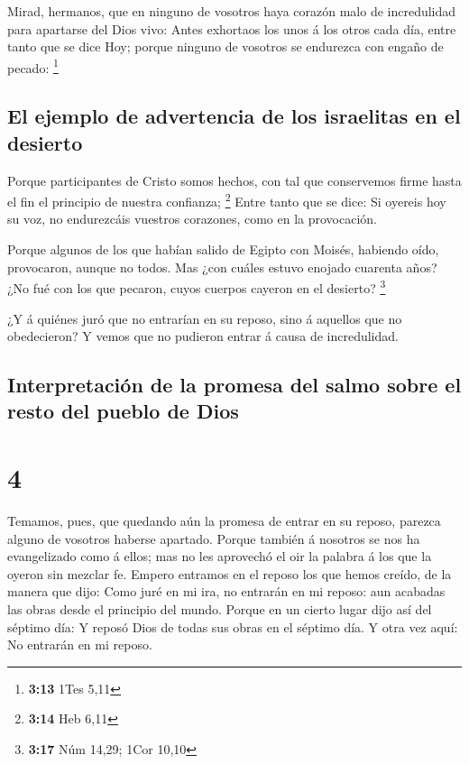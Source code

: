  Mirad, hermanos, que en ninguno de vosotros haya corazón
malo de incredulidad para apartarse del Dios vivo:  Antes
exhortaos los unos á los otros cada día, entre tanto que se dice Hoy;
porque ninguno de vosotros se endurezca con engaño de pecado:
\footnote{\textbf{3:13} 1Tes 5,11}

\hypertarget{el-ejemplo-de-advertencia-de-los-israelitas-en-el-desierto}{%
\subsection{El ejemplo de advertencia de los israelitas en el
desierto}\label{el-ejemplo-de-advertencia-de-los-israelitas-en-el-desierto}}

 Porque participantes de Cristo somos hechos, con tal que
conservemos firme hasta el fin el principio de nuestra confianza;
\footnote{\textbf{3:14} Heb 6,11}  Entre tanto que se dice:
Si oyereis hoy su voz, no endurezcáis vuestros corazones, como en la
provocación.

 Porque algunos de los que habían salido de Egipto con
Moisés, habiendo oído, provocaron, aunque no todos.  Mas
¿con cuáles estuvo enojado cuarenta años? ¿No fué con los que pecaron,
cuyos cuerpos cayeron en el desierto? \footnote{\textbf{3:17} Núm 14,29;
  1Cor 10,10}

 ¿Y á quiénes juró que no entrarían en su reposo, sino á
aquellos que no obedecieron?  Y vemos que no pudieron
entrar á causa de incredulidad.

\hypertarget{interpretaciuxf3n-de-la-promesa-del-salmo-sobre-el-resto-del-pueblo-de-dios}{%
\subsection{Interpretación de la promesa del salmo sobre el resto del
pueblo de
Dios}\label{interpretaciuxf3n-de-la-promesa-del-salmo-sobre-el-resto-del-pueblo-de-dios}}

\hypertarget{section-3}{%
\section{4}\label{section-3}}

 Temamos, pues, que quedando aún la promesa de entrar en su
reposo, parezca alguno de vosotros haberse apartado.  Porque
también á nosotros se nos ha evangelizado como á ellos; mas no les
aprovechó el oir la palabra á los que la oyeron sin mezclar fe.
 Empero entramos en el reposo los que hemos creído, de la
manera que dijo: Como juré en mi ira, no entrarán en mi reposo: aun
acabadas las obras desde el principio del mundo.  Porque en
un cierto lugar dijo así del séptimo día: Y reposó Dios de todas sus
obras en el séptimo día.  Y otra vez aquí: No entrarán en mi
reposo.

